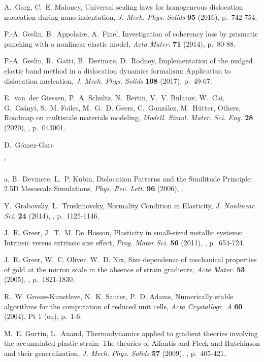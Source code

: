 \documentclass[CRPHYS,Unicode,manuscript]{cedram}
\def\i{\item}
\begin{document}
\begin{thebibliography}{100}
A.~Garg, C.~E. Maloney, {\og Universal scaling laws for homogeneous dislocation
  nucleation during nano-indentation\fg}, \emph{J. Mech. Phys. Solids}
  \textbf{95} (2016), p.~742-754.

P.-A. Geslin, B.~Appolaire, A.~Finel, {\og Investigation of coherency loss by
  prismatic punching with a nonlinear elastic model\fg}, \emph{Acta Mater.}
  \textbf{71} (2014), p.~80-88.

P.-A. Geslin, R.~Gatti, B.~Devincre, D.~Rodney, {\og Implementation of the
  nudged elastic band method in a dislocation dynamics formalism: Application
  to dislocation nucleation\fg}, \emph{J. Mech. Phys. Solids} \textbf{108}
  (2017), p.~49-67.

E.~van~der Giessen, P.~A. Schultz, N.~Bertin, V.~V. Bulatov, W.~Cai,
  G.~Cs{\'a}nyi, S.~M. Foiles, M.~G.~D. Geers, C.~Gonz{\'a}lez, M.~H{\"u}tter,
  {Others}, {\og Roadmap on multiscale materials modeling\fg}, \emph{Modell.
  Simul. Mater. Sci. Eng.} \textbf{28} (2020), , p.~043001.

D.~G{\'o}mez-Garc{\'\i}a, B.~Devincre, L.~P. Kubin, {\og Dislocation Patterns
  and the Similitude Principle: 2.5D Mesoscale Simulations\fg}, \emph{Phys.
  Rev. Lett.} \textbf{96} (2006), .

Y.~Grabovsky, L.~Truskinovsky, {\og Normality Condition in Elasticity\fg},
  \emph{J. Nonlinear Sci.} \textbf{24} (2014), , p.~1125-1146.

J.~R. Greer, J.~T.~M. De~Hosson, {\og Plasticity in small-sized metallic
  systems: Intrinsic versus extrinsic size effect\fg}, \emph{Prog. Mater Sci.}
  \textbf{56} (2011), , p.~654-724.

J.~R. Greer, W.~C. Oliver, W.~D. Nix, {\og Size dependence of mechanical
  properties of gold at the micron scale in the absence of strain
  gradients\fg}, \emph{Acta Mater.} \textbf{53} (2005), ,
  p.~1821-1830.

R.~W. Grosse-Kunstleve, N.~K. Sauter, P.~D. Adams, {\og Numerically stable
  algorithms for the computation of reduced unit cells\fg}, \emph{Acta
  Crystallogr. A} \textbf{60} (2004), \cdrnumero Pt 1 (en), p.~1-6.

M.~E. Gurtin, L.~Anand, {\og Thermodynamics applied to gradient theories
  involving the accumulated plastic strain: The theories of Aifantis and Fleck
  and Hutchinson and their generalization\fg}, \emph{J. Mech. Phys. Solids}
  \textbf{57} (2009), , p.~405-421.


\end{thebibliography}
\end{document}
